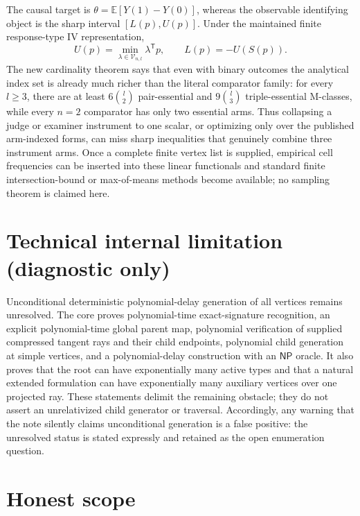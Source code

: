 \documentclass{article}
\begin{document}
The causal target is \(\theta=\mathbb E[Y(1)-Y(0)]\), whereas the observable identifying object is the sharp interval \([L(p),U(p)]\). Under the maintained finite response-type IV representation,
\[U(p)=\min_{\lambda\in\mathcal V_{n,l}}\lambda^{\mathsf T}p,\qquad L(p)=-U(S(p)).\]
The new cardinality theorem says that even with binary outcomes the analytical index set is already much richer than the literal comparator family: for every \(l\ge3\), there are at least \(6\binom l2\) pair-essential and \(9\binom l3\) triple-essential M-classes, while every \(n=2\) comparator has only two essential arms. Thus collapsing a judge or examiner instrument to one scalar, or optimizing only over the published arm-indexed forms, can miss sharp inequalities that genuinely combine three instrument arms. Once a complete finite vertex list is supplied, empirical cell frequencies can be inserted into these linear functionals and standard finite intersection-bound or max-of-means methods become available; no sampling theorem is claimed here.

\section*{Technical internal limitation (diagnostic only)}

Unconditional deterministic polynomial-delay generation of all vertices remains unresolved. The core proves polynomial-time exact-signature recognition, an explicit polynomial-time global parent map, polynomial verification of supplied compressed tangent rays and their child endpoints, polynomial child generation at simple vertices, and a polynomial-delay construction with an \(\mathsf{NP}\) oracle. It also proves that the root can have exponentially many active types and that a natural extended formulation can have exponentially many auxiliary vertices over one projected ray. These statements delimit the remaining obstacle; they do not assert an unrelativized child generator or traversal. Accordingly, any warning that the note silently claims unconditional generation is a false positive: the unresolved status is stated expressly and retained as the open enumeration question.

\section{Honest scope}
\end{document}
